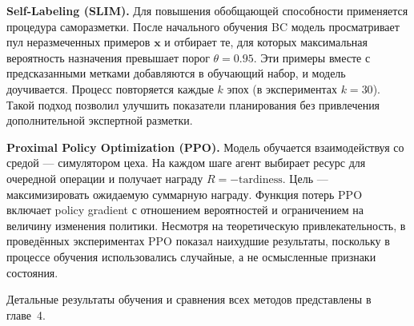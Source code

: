 \textbf{Self-Labeling (SLIM).} Для повышения обобщающей способности применяется процедура саморазметки. После начального обучения BC модель просматривает пул неразмеченных примеров $\mathbf{x}$ и отбирает те, для которых максимальная вероятность назначения превышает порог $\theta = 0.95$. Эти примеры вместе с предсказанными метками добавляются в обучающий набор, и модель доучивается. Процесс повторяется каждые $k$ эпох (в экспериментах $k = 30$). Такой подход позволил улучшить показатели планирования без привлечения дополнительной экспертной разметки.

\textbf{Proximal Policy Optimization (PPO).} Модель обучается взаимодействуя со средой — симулятором цеха. На каждом шаге агент выбирает ресурс для очередной операции и получает награду $R = -\text{tardiness}$. Цель — максимизировать ожидаемую суммарную награду. Функция потерь PPO включает policy gradient с отношением вероятностей и ограничением на величину изменения политики. Несмотря на теоретическую привлекательность, в проведённых экспериментах PPO показал наихудшие результаты, поскольку в процессе обучения использовались случайные, а не осмысленные признаки состояния.

Детальные результаты обучения и сравнения всех методов представлены в главе~4.